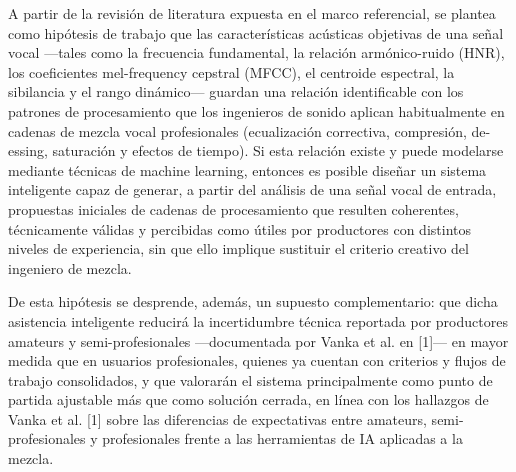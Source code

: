 A partir de la revisión de literatura expuesta en el marco referencial, se plantea como hipótesis de trabajo que las características acústicas objetivas de una señal vocal —tales como la frecuencia fundamental, la relación armónico-ruido (HNR), los coeficientes mel-frequency cepstral (MFCC), el centroide espectral, la sibilancia y el rango dinámico— guardan una relación identificable con los patrones de procesamiento que los ingenieros de sonido aplican habitualmente en cadenas de mezcla vocal profesionales (ecualización correctiva, compresión, de-essing, saturación y efectos de tiempo). Si esta relación existe y puede modelarse mediante técnicas de machine learning, entonces es posible diseñar un sistema inteligente capaz de generar, a partir del análisis de una señal vocal de entrada, propuestas iniciales de cadenas de procesamiento que resulten coherentes, técnicamente válidas y percibidas como útiles por productores con distintos niveles de experiencia, sin que ello implique sustituir el criterio creativo del ingeniero de mezcla.

De esta hipótesis se desprende, además, un supuesto complementario: que dicha asistencia inteligente reducirá la incertidumbre técnica reportada por productores amateurs y semi-profesionales —documentada por Vanka et al. en [1]— en mayor medida que en usuarios profesionales, quienes ya cuentan con criterios y flujos de trabajo consolidados, y que valorarán el sistema principalmente como punto de partida ajustable más que como solución cerrada, en línea con los hallazgos de Vanka et al. [1] sobre las diferencias de expectativas entre amateurs, semi-profesionales y profesionales frente a las herramientas de IA aplicadas a la mezcla.